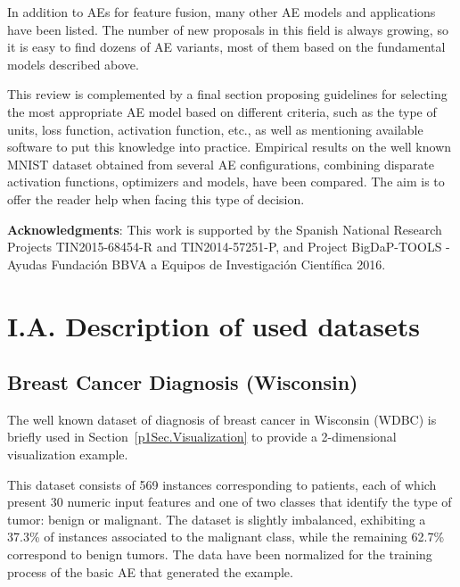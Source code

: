 In addition to AEs for feature fusion, many other AE models and applications have been listed. The number of new proposals in this field is always growing, so it is easy to find dozens of AE variants, most of them based on the fundamental models described above.

This review is complemented by a final section proposing guidelines for selecting the most appropriate AE model based on different criteria, such as the type of units, loss function, activation function, etc., as well as mentioning available software to put this knowledge into practice. Empirical results on the well known MNIST dataset obtained from several AE configurations, combining disparate activation functions, optimizers and models, have been compared. The aim is to offer the reader help when facing this type of decision.

\textbf{Acknowledgments}:  This work is supported by the Spanish National Research Projects TIN2015-68454-R and  TIN2014-57251-P, and Project BigDaP-TOOLS - Ayudas Fundaci\'on BBVA a Equipos de Investigaci\'on Cient\'ifica 2016. 



\section*{I.A. Description of used datasets}

\subsection{Breast Cancer Diagnosis (Wisconsin)}

The well known dataset of diagnosis of breast cancer in Wisconsin (WDBC)  is briefly used in Section~\ref{p1Sec.Visualization} to provide a 2-dimensional visualization example.

This dataset consists of 569 instances corresponding to patients, each of which present 30 numeric input features and one of two classes that identify the type of tumor: benign or malignant. The dataset is slightly imbalanced, exhibiting a 37.3\% of instances associated to the malignant class, while the remaining 62.7\% correspond to benign tumors. The data have been normalized for the training process of the basic AE that generated the example.

